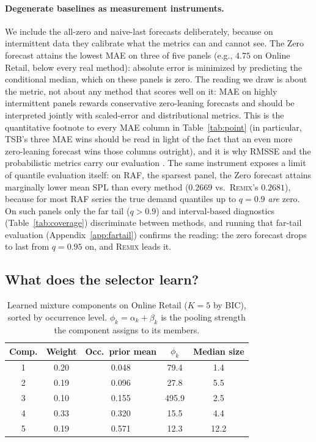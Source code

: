 \documentclass[twocolumn,10pt]{article}
\newcommand{\REMIX}{\textsc{Remix}}
\begin{document}
\paragraph{Degenerate baselines as measurement instruments.} We include
the all-zero and naive-last forecasts deliberately, because on
intermittent data they calibrate what the metrics can and cannot see.
The Zero forecast attains the lowest MAE on three of five panels (e.g.,
$4.75$ on Online Retail, below every real method): absolute error is
minimized by predicting the conditional median, which on these panels is
zero. The reading we draw is about the metric, not about any method that
scores well on it: MAE on highly intermittent panels rewards
conservative zero-leaning forecasts and should be interpreted jointly
with scaled-error and distributional metrics. This is the
quantitative footnote to every MAE column in Table~\ref{tab:point}
(in particular, TSB's three MAE wins should be read in light of the fact
that an even more zero-leaning forecast wins those columns
outright), and it is why RMSSE and the probabilistic metrics carry our
evaluation \citep{kolassa2016}. The same instrument exposes a limit of
quantile evaluation itself: on RAF, the sparsest panel, the Zero
forecast attains marginally lower mean SPL than every method
($0.2669$ vs.\ \REMIX{}'s $0.2681$), because for most RAF series the
true demand quantiles up to $q{=}0.9$ \emph{are} zero. On such panels
only the far tail ($q>0.9$) and interval-based diagnostics
(Table~\ref{tab:coverage}) discriminate between methods, and running
that far-tail evaluation (Appendix~\ref{app:fartail}) confirms the
reading: the zero forecast drops to last from $q{=}0.95$ on, and
\REMIX{} leads it.

\subsection{What does the selector learn?}\label{sec:selector}

\begin{table}[t]
\centering
\caption{Learned mixture components on Online Retail ($K{=}5$ by BIC),
sorted by occurrence level. $\phi_k=\alpha_k+\beta_k$ is the pooling
strength the component assigns to its members.}
\label{tab:components}
\small
\setlength{\tabcolsep}{4.2pt}
\begin{tabular}{ccccc}
\toprule
Comp. & Weight & Occ.\ prior mean & $\phi_k$ & Median size\\
\midrule
1 & 0.20 & 0.048 & 79.4 & 1.4\\
2 & 0.19 & 0.096 & 27.8 & 5.5\\
3 & 0.10 & 0.155 & 495.9 & 2.5\\
4 & 0.33 & 0.320 & 15.5 & 4.4\\
5 & 0.19 & 0.571 & 12.3 & 12.2\\
\bottomrule
\end{tabular}
\end{table}
\end{document}

